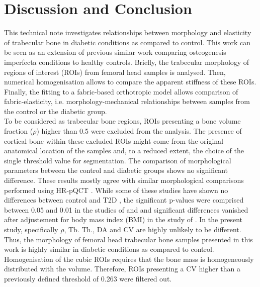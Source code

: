 \documentclass[a4paper,fleqn]{DC_ArtStyle}
\begin{document}
	
	\section{Discussion and Conclusion}
	This technical note investigates relationships between morphology and elasticity of trabecular bone in diabetic conditions as compared to control.
	This work can be seen as an extension of previous similar work \cite{Simon2022} comparing osteogenesis imperfecta conditions to healthy controls.
	Briefly, the trabecular morphology of regions of interest (ROIs) from femoral head samples is analysed.
	Then, numerical homogenisation allows to compare the apparent stiffness of these ROIs.
	Finally, the fitting to a fabric-based orthotropic model \cite{Zysset1995} allows comparison of fabric-elasticity, i.e. morphology-me\-chanical relationships between samples from the control or the diabetic group.
	\\[0.5em]
	To be considered as trabecular bone regions, ROIs presenting a bone volume fraction ($\rho$) higher than 0.5 were excluded from the analysis.
	The presence of cortical bone within these excluded ROIs might come from the original anatomical location of the samples and, to a reduced extent, the choice of the single threshold value for segmentation.
	The comparison of morphological parameters between the control and diabetic groups shows no significant difference.
	These results mostly agree with similar morphological comparisons performed using HR-pQCT \cite{Burghardt2010, Shu2012, Farr2014, Paccou2015, Samelson2018, vanHulten2024}.
	While some of these studies have shown no differences between control and T2D \cite{Shu2012, Samelson2018, vanHulten2024}, the significant p-values were comprised between 0.05 and 0.01 in the studies of \cite{Burghardt2010}\cite{Burghardt2010} and \citeauthor{Paccou2015}\cite{Paccou2015} and significant differences vanished after adjustement for body mass index (BMI) in the study of \citeauthor{Farr2014}\cite{Farr2014}.
	In the present study, specifically $\rho$, Tb. Th., DA and CV are highly unlikely to be different.
	Thus, the morphology of femoral head trabecular bone samples presented in this work is highly similar in diabetic conditions as compared to control.
	\\[0.5em]
	Homogenisation of the cubic ROIs requires that the bone mass is homogeneously distributed with the volume.
	Therefore, ROIs presenting a CV higher than a previously defined threshold of 0.263 \cite{Panyasantisuk2015} were filtered out.
\end{document}
